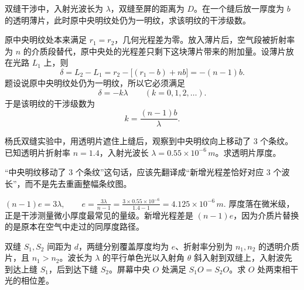 \begin{exercise}[双缝加透明薄片后原中央明纹的级次]
双缝干涉中，入射光波长为 \(\lambda\)，双缝至屏的距离为 \(D\)。在一个缝后放一厚度为 \(b\) 的透明薄片，此时原中央明纹处仍为一明纹，求该明纹的干涉级数。
\end{exercise}

\begin{solution}
原中央明纹处本来满足 \(r_1=r_2\)，几何光程差为零。放入薄片后，空气段被折射率为 \(n\) 的介质段替代，原中央处的光程差只剩下这块薄片带来的附加量。设薄片放在光路 \(L_1\) 上，则
\[
\delta=L_2-L_1
=r_2-\bigl[(r_1-b)+nb\bigr]
=-(n-1)b.
\]
题设说原中央明纹处仍为一明纹，所以它必须满足
\[
\delta=-k\lambda\qquad (k=0,1,2,\dots).
\]
于是该明纹的干涉级数为
\[
k=\frac{(n-1)b}{\lambda}.
\]
\end{solution}


\begin{exercise}
杨氏双缝实验中，用透明片遮住上缝后，观察到中央明纹向上移动了 3 个条纹。已知透明片折射率 \(n=1.4\)，入射光波长 \(\lambda=0.55\times10^{-6}\,\si{m}\)。求透明片厚度。
\end{exercise}

\begin{solution}
“中央明纹移动了 3 个条纹”这句话，应该先翻译成“新增光程差恰好对应 3 个波长”，而不是先去重画整幅条纹图。

 \((n-1)e=3\lambda,\qquad e=\frac{3\lambda}{n-1} =\frac{3\times0.55\times10^{-6}}{1.4-1} =4.125\times10^{-6}\,\si{m}.\) 
厚度落在微米级，正是干涉测量微小厚度最常见的量级。新增光程差是 \((n-1)e\)，因为介质片替换的是原本在空气中走过的同厚度路径。
\end{solution}


\begin{exercise}
双缝 \(S_1,S_2\) 间距为 \(d\)，两缝分别覆盖厚度均为 \(e\)、折射率分别为 \(n_1,n_2\) 的透明介质片，且 \(n_1>n_2\)。波长为 \(\lambda\) 的平行单色光以入射角 \(\theta\) 斜入射到双缝上，入射波先到达上缝 \(S_1\)，后到达下缝 \(S_2\)。屏幕中央 \(O\) 处满足 \(S_1O=S_2O\)。求 \(O\) 处两束相干光的相位差。

\begin{center}
\end{center}
\end{exercise}

